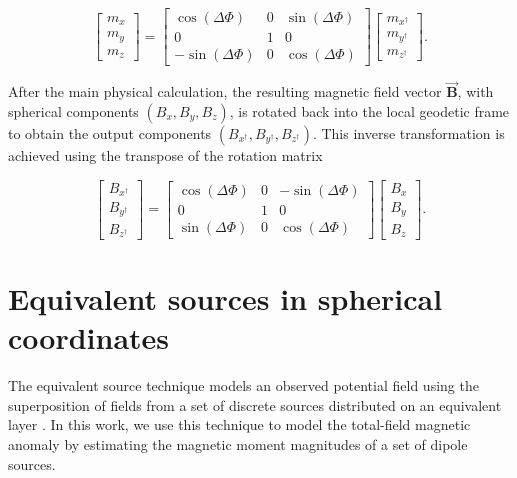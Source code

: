 \documentclass[a4paper,oneside,10pt]{book}
\begin{document}
\begin{equation}
\begin{bmatrix}
    m_{x} \\
    m_{y} \\
    m_{z}
\end{bmatrix}
=
\begin{bmatrix}
    \cos(\Delta\Phi)  & 0 & \sin(\Delta\Phi) \\
    0 & 1 & 0\\
    -\sin(\Delta\Phi) & 0 & \cos(\Delta\Phi)
\end{bmatrix}
\begin{bmatrix}
    m_{x^{\dagger}} \\
    m_{y^{\dagger}} \\
    m_{z^{\dagger}}
\end{bmatrix} .
\end{equation}

After the main physical calculation, the resulting magnetic field vector $\vec{\mathbf{B}}$, with
spherical components $(B_x, B_y, B_z)$, is rotated back into the local geodetic frame to
obtain the output components $(B_{x^{\dagger}}, B_{y^{\dagger}}, B_{z^{\dagger}})$. This inverse transformation is achieved using the transpose
of the rotation matrix

\begin{equation}
\begin{bmatrix}
    B_{x^{\dagger}} \\
    B_{y^{\dagger}} \\
    B_{z^{\dagger}}
\end{bmatrix}
=
\begin{bmatrix}
    \cos(\Delta\Phi) & 0 & -\sin(\Delta\Phi) \\
    0 & 1 & 0 \\
    \sin(\Delta\Phi) & 0 & \cos(\Delta\Phi)
\end{bmatrix}
\begin{bmatrix}
    B_x \\
    B_y \\
    B_z
\end{bmatrix}.
\end{equation}

\section{Equivalent sources in spherical coordinates}

The equivalent source technique models an observed potential field using the superposition of fields
from a set of discrete sources distributed on an equivalent layer \citep{Dampney1969, OliveiraJunior2023}.
In this work, we use this technique to model the total-field magnetic anomaly by estimating the magnetic
moment magnitudes of a set of dipole sources.
\end{document}
